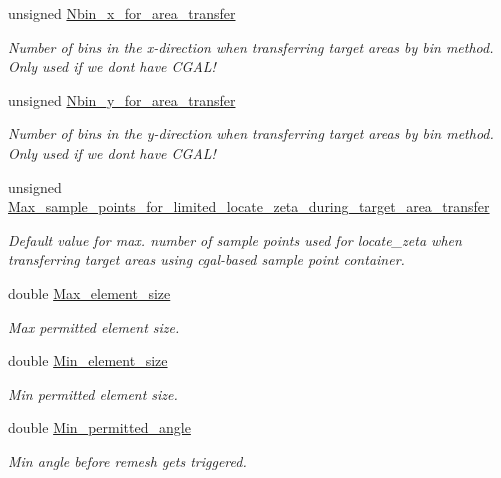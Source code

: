 \begin{DoxyCompactItemize}
unsigned \hyperlink{classoomph_1_1RefineableTriangleMesh_a3a9e90149a6ccc80f1bccca77f46fb2e}{Nbin\+\_\+x\+\_\+for\+\_\+area\+\_\+transfer}
\begin{DoxyCompactList}\small\item\em Number of bins in the x-\/direction when transferring target areas by bin method. Only used if we don\textquotesingle{}t have C\+G\+A\+L! \end{DoxyCompactList}\item 
unsigned \hyperlink{classoomph_1_1RefineableTriangleMesh_af2c7213f1094f8e81e7dbd28b60cff18}{Nbin\+\_\+y\+\_\+for\+\_\+area\+\_\+transfer}
\begin{DoxyCompactList}\small\item\em Number of bins in the y-\/direction when transferring target areas by bin method. Only used if we don\textquotesingle{}t have C\+G\+A\+L! \end{DoxyCompactList}\item 
unsigned \hyperlink{classoomph_1_1RefineableTriangleMesh_a8b3f579874e42d3480734d8e98d689e5}{Max\+\_\+sample\+\_\+points\+\_\+for\+\_\+limited\+\_\+locate\+\_\+zeta\+\_\+during\+\_\+target\+\_\+area\+\_\+transfer}
\begin{DoxyCompactList}\small\item\em Default value for max. number of sample points used for locate\+\_\+zeta when transferring target areas using cgal-\/based sample point container. \end{DoxyCompactList}\item 
double \hyperlink{classoomph_1_1RefineableTriangleMesh_a35205d1ccdc32f0242f75941162f982e}{Max\+\_\+element\+\_\+size}
\begin{DoxyCompactList}\small\item\em Max permitted element size. \end{DoxyCompactList}\item 
double \hyperlink{classoomph_1_1RefineableTriangleMesh_ab242d22770f3248b35553a3eaf08f877}{Min\+\_\+element\+\_\+size}
\begin{DoxyCompactList}\small\item\em Min permitted element size. \end{DoxyCompactList}\item 
double \hyperlink{classoomph_1_1RefineableTriangleMesh_a7b7b3acbda9a79f8a1f0cc195dc72cb9}{Min\+\_\+permitted\+\_\+angle}
\begin{DoxyCompactList}\small\item\em Min angle before remesh gets triggered. \end{DoxyCompactList}\item 

\end{DoxyCompactItemize}
